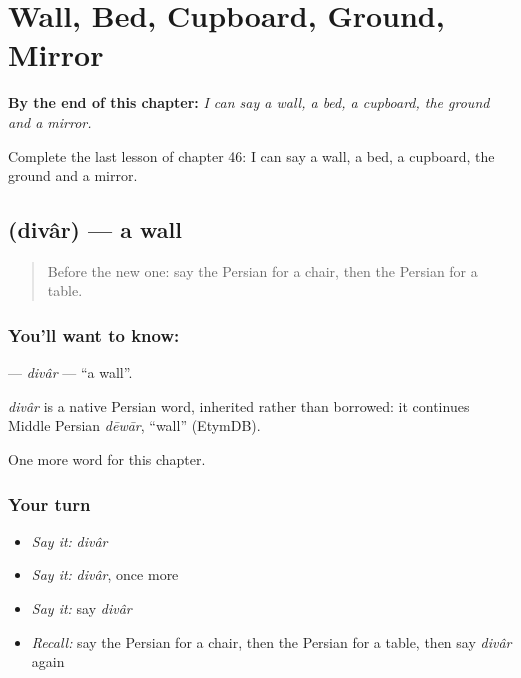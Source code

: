 
\chapter{Wall, Bed, Cupboard, Ground, Mirror}
\label{ch:fa-wall-bed-cupboard-ground-mirror}

\begin{chapteropening}
\textbf{By the end of this chapter:} \emph{I can say a wall, a bed, a cupboard, the ground and a mirror.}

Complete the last lesson of chapter 46: I can say a wall, a bed, a cupboard, the ground and a mirror.
\end{chapteropening}

\section[\texorpdfstring{\fa{دیوار} (divâr)}{دیوار (divâr)}]{ (divâr) — a wall}

\label{lesson:FA-C46-divar}



\begin{quote}
Before the new one: say the Persian for a chair, then the Persian for a table.
\end{quote}

\subsection*{You'll want to know: }
\textbf{} — \emph{divâr} — \textquotedblleft{}a wall\textquotedblright{}.

\begin{cousinweb}
\emph{divâr} is a native Persian word, inherited rather than borrowed: it continues Middle Persian \emph{dēwār}, \textquotedblleft{}wall\textquotedblright{} (EtymDB).
\end{cousinweb}

\begin{grammarlens}[title={What you've built}]
One more word for this chapter.
\end{grammarlens}

\subsection*{Your turn}
\begin{itemize}
\raggedright
  \item \emph{Say it:} \emph{divâr}
  \item \emph{Say it:} \emph{divâr}, once more
  \item \emph{Say it:} say \emph{divâr}
  \item \emph{Recall:} say the Persian for a chair, then the Persian for a table, then say \emph{divâr} again
\end{itemize}

